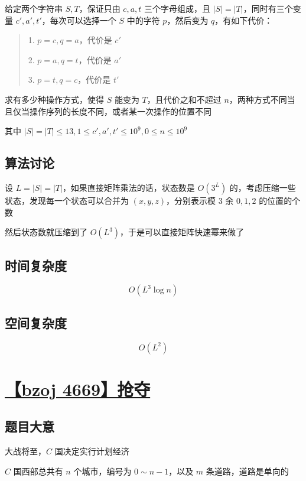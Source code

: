 \documentclass[UTF8]{article}
\begin{document}
给定两个字符串 $S,T$，保证只由 $c,a,t$ 三个字母组成，且 $|S|=|T|$，同时有三个变量 $c',a',t'$，每次可以选择一个 $S$ 中的字符 $p$，然后变为 $q$，有如下代价：

\begin{quotation}

1. $p=c, q=a$，代价是 $c'$

2. $p=a, q=t$，代价是 $a'$

3. $p=t, q=c$，代价是 $t'$

\end{quotation}

求有多少种操作方式，使得 $S$ 能变为 $T$，且代价之和不超过 $n$，两种方式不同当且仅当操作序列的长度不同，或者某一次操作的位置不同

其中 $|S|=|T| \le 13, 1 \le c', a', t' \le 10^9, 0 \le n \le 10^9$

\subsection{算法讨论}

设 $L=|S|=|T|$，如果直接矩阵乘法的话，状态数是 $O(3^{L})$ 的，考虑压缩一些状态，发现每一个状态可以合并为 $(x, y, z)$，分别表示模 $3$ 余 $0, 1, 2$ 的位置的个数

然后状态数就压缩到了 $O(L^3)$，于是可以直接矩阵快速幂来做了

\subsection{时间复杂度}

$$
O(L^3 \log n)
$$

\subsection{空间复杂度}

$$
O(L^2)
$$

\section{\href{https://lydsy.com/JudgeOnline/problem.php?id=4669}{【bzoj 4669】抢夺}}

\subsection{题目大意}

大战将至，$C$ 国决定实行计划经济

$C$ 国西部总共有 $n$ 个城市，编号为 $0 \sim n-1$，以及 $m$ 条道路，道路是单向的
\end{document}
